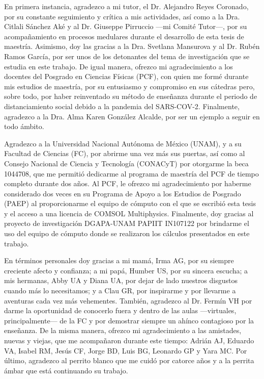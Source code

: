 
\begin{acknowledgements}
\vfill
En primera instancia, agradezco a mi tutor, el Dr. Alejandro Reyes Coronado, por su constante seguimiento y crítica a mis actividades, así como a la Dra. Citlali Sánchez Aké y al Dr. Giuseppe Pirruccio ---mi Comité Tutor---,  por su acompañamiento en procesos medulares durante el desarrollo de esta tesis de maestría. Asimismo, doy las gracias a la Dra. Svetlana Mansurova y al Dr. Rubén Ramos García, por ser unos de los detonantes del tema de investigación que se estudia en este trabajo. De igual manera, ofrezco mi agradecimiento a los docentes del Posgrado en Ciencias Físicas (PCF), con quien me formé durante mis estudios de maestría, por su entusiasmo y compromiso en sus cátedras pero, sobre todo, por haber reinventado su método de enseñanza durante el periodo de  distanciamiento social debido a la pandemia del SARS-COV-2. Finalmente, agradezco a la Dra. Alma Karen González Alcalde, por ser un ejemplo a seguir en todo ámbito.

Agradezco a la Universidad Nacional Autónoma de México (UNAM), y a su Facultad de Ciencias (FC), por abrirme una vez más sus puertas, así como al Consejo Nacional de Ciencia y Tecnología (CONACyT)  por otorgarme la beca 1044708, que me permitió dedicarme al programa de maestría del PCF de tiempo completo durante dos años. Al PCF, le ofrezco mi agradecimiento por haberme considerado dos veces en su Programa de Apoyo a los Estudios de Posgrado (PAEP) al proporcionarme el equipo de cómputo con el que se escribió esta tesis y el acceso a una licencia de COMSOL Multiphysics\texttrademark{}. Finalmente, doy gracias  al proyecto de investigación DGAPA-UNAM PAPIIT IN107122 por brindarme el uso del equipo de cómputo donde se realizaron los cálculos presentados en este trabajo.

En términos personales doy gracias a mi mamá, Irma AG, por su siempre creciente afecto y confianza; a mi papá, Humber US, por su sincera escucha; a mis hermanas, Abby UA y Diana UA, por dejar de lado nuestros disgustos cuando más lo necesitamos; y a Clau GR, por inspirarme y por llevarme a aventuras cada vez más vehementes. También, agradezco al Dr. Fermín VH por darme la oportunidad de conocerlo fuera y dentro de las aulas ---virtuales, principalmente--- de la FC y por demostrar siempre un ahínco contagioso por la enseñanza. De la misma manera, ofrezco mi agradecimiento a las amistades, nuevas y viejas, que me acompañaron durante este tiempo: Adrián AJ, Eduardo VA, Isabel RM, Jesús CF, Jorge BD, Luis BG,  Leonardo GP y Yara MC. Por último, agradezco al perrito blanco que me cuidó por catorce años y a la perrita ámbar que está continuando su trabajo.

\end{acknowledgements}
